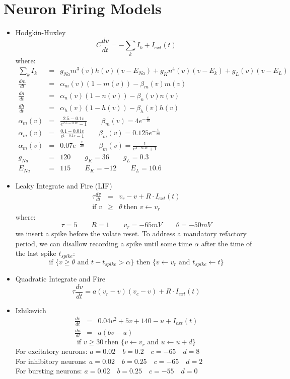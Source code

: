 \documentclass[a4paper,10pt]{article}
\begin{document}
\section{Neuron Firing Models}
\begin{itemize}
  \item Hodgkin-Huxley
  $$
  \boxed{C\frac{dv}{dt} = -\sum_k I_k + I_{ext}(t)}
  $$
  where:
  \begin{eqnarray*}
  \sum_k I_k & = & g_{Na} m^3(v) h(v) (v - E_{Na}) + g_{K} n^4(v) (v - E_k) + g_L(v) (v - E_L) \\
  \frac{dm}{dt} & = & \alpha_m (v)( 1 - m(v) ) - \beta_m (v) m(v) \\
  \frac{dn}{dt} & = & \alpha_n (v)( 1 - n(v) ) - \beta_n (v) n(v) \\
  \frac{dh}{dt} & = & \alpha_h (v)( 1 - h(v) ) - \beta_h (v) h(v) \\
  \alpha_m (v) &=& \frac{2.5 - 0.1v}{e^{2.5-0.1v} - 1} \qquad \beta_m (v) = 4e^{-\frac{v}{18}} \\
  \alpha_m (v) &=& \frac{0.1 - 0.01v}{e^{1-0.1v} - 1} \qquad \beta_m (v) = 0.125e^{-\frac{v}{80}} \\
  \alpha_m (v) &=& 0.07e^{-\frac{v}{20}} \qquad \beta_m (v) = \frac{1}{e^{3 - 0.1v} + 1} \\
  g_{Na} & = & 120 \qquad g_K = 36 \qquad g_L = 0.3 \\
  E_{Na} & = & 115 \qquad E_K = -12 \qquad E_L = 10.6
  \end{eqnarray*}

  \item Leaky Integrate and Fire (LIF)
  \begin{eqnarray*}
  \tau \frac{dv}{dt} &=& v_r - v + R \cdot I_{ext}(t) \\
  \text{if } v &\geq& \theta \: \text{then } v \leftarrow v_r
  \end{eqnarray*}
  where:
  $$
  \tau = 5 \qquad R = 1 \qquad v_r = -65mV \qquad \theta = -50mV
  $$
  we insert a spike before the volate reset.  To address a mandatory refactory period,  we can disallow recording a spike until some time $\alpha$ after the time of the last spike $t_{spike}$:
  $$
  \text{if  } \{v \geq \theta \text{  and  } t - t_{spike} > \alpha\} \text{  then  } \{v \leftarrow v_r \text{  and  } t_{spike}\leftarrow t\}
  $$
  \item Quadratic Integrate and Fire
  $$
  \tau \frac{dv}{dt} = a (v_r - v)(v_c - v) + R\cdot I_{ext}(t)
  $$
  \item Izhikevich
  \begin{eqnarray*}
  \frac{dv}{dt} &=& 0.04v^2 + 5v + 140 - u + I_{ext}(t) \\
  \frac{du}{dt} &=& a(bv - u)
  \end{eqnarray*}
  $$
  \text{if } v \geq 30 \: \text{then } \{v \leftarrow v_r\text{  and  } u \leftarrow u + d\}
  $$
  For excitatory neurons: $a = 0.02 \quad b = 0.2 \quad c = -65 \quad d = 8$ \\
  For inhibitory neurons: $a = 0.02 \quad b = 0.25 \quad c = -65 \quad d = 2$ \\
  For bursting neurons: $a = 0.02 \quad b = 0.25 \quad c = -55 \quad d = 0$ \\
\end{itemize}
\end{document}
